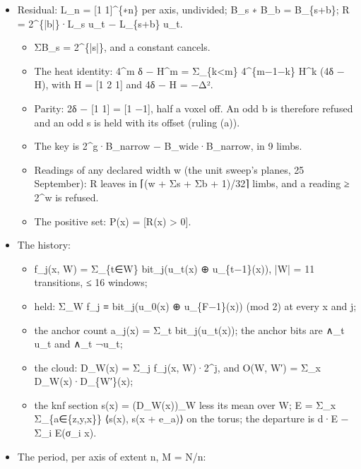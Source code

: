 \begin{itemize}
\item Residual: L\_\allowbreak{}n = [1 1]\textasciicircum{}\{∗n\} per axis, undivided; B\_\allowbreak{}s ∗ B\_\allowbreak{}b = B\_\allowbreak{}\{s+b\}; R = 2\textasciicircum{}\{|b|\}·L\_\allowbreak{}s u\_\allowbreak{}t − L\_\allowbreak{}\{s+b\} u\_\allowbreak{}t.

\begin{itemize}
\item ΣB\_\allowbreak{}s = 2\textasciicircum{}\{|s|\}, and a constant cancels.
\item The heat identity: 4\textasciicircum{}m δ − H\textasciicircum{}m = Σ\_\allowbreak{}\{k<m\} 4\textasciicircum{}\{m−1−k\} H\textasciicircum{}k (4δ − H), with H = [1 2 1] and 4δ − H = −Δ².
\item Parity: 2δ − [1 1] = [1 −1], half a voxel off. An odd b is therefore refused and an odd s is held with its offset (ruling (a)).
\item The key is 2\textasciicircum{}g·B\_\allowbreak{}narrow − B\_\allowbreak{}wide·B\_\allowbreak{}narrow, in 9 limbs.
\item Readings of any declared width w (the unit sweep's planes, 25 September): R leaves in ⌈(w + Σs + Σb + 1)/32⌉ limbs, and a reading ≥ 2\textasciicircum{}w is refused.
\item The positive set: P(x) = [R(x) > 0].
\end{itemize}
\item The history:

\begin{itemize}
\item f\_\allowbreak{}j(x, W) = Σ\_\allowbreak{}\{t∈W\} bit\_\allowbreak{}j(u\_\allowbreak{}t(x) ⊕ u\_\allowbreak{}\{t−1\}(x)), |W| = 11 transitions, ≤ 16 windows;
\item held: Σ\_\allowbreak{}W f\_\allowbreak{}j ≡ bit\_\allowbreak{}j(u\_\allowbreak{}0(x) ⊕ u\_\allowbreak{}\{F−1\}(x)) (mod 2) at every x and j;
\item the anchor count a\_\allowbreak{}j(x) = Σ\_\allowbreak{}t bit\_\allowbreak{}j(u\_\allowbreak{}t(x)); the anchor bits are ∧\_\allowbreak{}t u\_\allowbreak{}t and ∧\_\allowbreak{}t ¬u\_\allowbreak{}t;
\item the cloud: D\_\allowbreak{}W(x) = Σ\_\allowbreak{}j f\_\allowbreak{}j(x, W)·2\textasciicircum{}j, and O(W, W′) = Σ\_\allowbreak{}x D\_\allowbreak{}W(x)·D\_\allowbreak{}\{W′\}(x);
\item the knf section s(x) = (D\_\allowbreak{}W(x))\_\allowbreak{}W less its mean over W; E = Σ\_\allowbreak{}x Σ\_\allowbreak{}\{a∈\{z,y,x\}\} ⟨s(x), s(x + e\_\allowbreak{}a)⟩ on the torus; the departure is d·E − Σ\_\allowbreak{}i E(σ\_\allowbreak{}i x).
\end{itemize}
\item The period, per axis of extent n, M = N/n:


\end{itemize}
